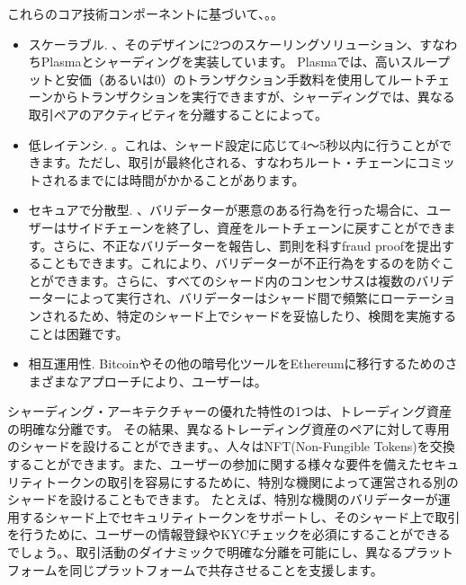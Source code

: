 これらのコア技術コンポーネントに基づいて、。。

\begin{itemize}
\item スケーラブル. 、そのデザインに2つのスケーリングソリューション、すなわちPlasmaとシャーディングを実装しています。 Plasmaでは、高いスループットと安価（あるいは0）のトランザクション手数料を使用してルートチェーンからトランザクションを実行できますが、シャーディングでは、異なる取引ペアのアクティビティを分離することによって。
\item 低レイテンシ. 。これは、シャード設定に応じて4〜5秒以内に行うことができます。ただし、取引が最終化される、すなわちルート・チェーンにコミットされるまでには時間がかかることがあります。
\item セキュアで分散型. 、バリデーターが悪意のある行為を行った場合に、ユーザーはサイドチェーンを終了し、資産をルートチェーンに戻すことができます。さらに、不正なバリデーターを報告し、罰則を科すfraud proofを提出することもできます。これにより、バリデーターが不正行為をするのを防ぐことができます。さらに、すべてのシャード内のコンセンサスは複数のバリデーターによって実行され、バリデーターはシャード間で頻繁にローテーションされるため、特定のシャード上でシャードを妥協したり、検閲を実施することは困難です。
\item 相互運用性. Bitcoinやその他の暗号化ツールをEthereumに移行するためのさまざまなアプローチにより、ユーザーは。
\end{itemize}

シャーディング・アーキテクチャーの優れた特性の1つは、トレーディング資産の明確な分離です。 その結果、異なるトレーディング資産のペアに対して専用のシャードを設けることができます。、人々はNFT(Non-Fungible Tokens)を交換することができます。また、ユーザーの参加に関する様々な要件を備えたセキュリティトークンの取引を容易にするために、特別な機関によって運営される別のシャードを設けることもできます。 たとえば、特別な機関のバリデーターが運用するシャード上でセキュリティトークンをサポートし、そのシャード上で取引を行うために、ユーザーの情報登録やKYCチェックを必須にすることができるでしょう。、取引活動のダイナミックで明確な分離を可能にし、異なるプラットフォームを同じプラットフォームで共存させることを支援します。

